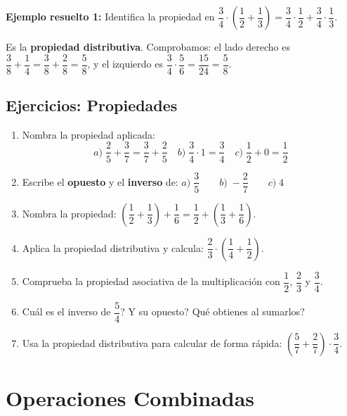 \documentclass[12pt, letterpaper]{article}
\begin{document}
\noindent\textbf{Ejemplo resuelto 1:} Identifica la propiedad en $\dfrac{3}{4} \cdot \left(\dfrac{1}{2} + \dfrac{1}{3}\right) = \dfrac{3}{4} \cdot \dfrac{1}{2} + \dfrac{3}{4} \cdot \dfrac{1}{3}$.

Es la \textbf{propiedad distributiva}. Comprobamos: el lado derecho es $\dfrac{3}{8} + \dfrac{1}{4} = \dfrac{3}{8} + \dfrac{2}{8} = \dfrac{5}{8}$, y el izquierdo es $\dfrac{3}{4} \cdot \dfrac{5}{6} = \dfrac{15}{24} = \dfrac{5}{8}$. \checkmark

\subsection{Ejercicios: Propiedades}

\begin{enumerate}[leftmargin=*]
  \item \facil{} Nombra la propiedad aplicada:
        \[ a)\; \frac{2}{5} + \frac{3}{7} = \frac{3}{7} + \frac{2}{5} \quad b)\; \frac{3}{4} \cdot 1 = \frac{3}{4} \quad c)\; \frac{1}{2} + 0 = \frac{1}{2} \]

  \item \facil{} Escribe el \textbf{opuesto} y el \textbf{inverso} de: $a)\; \dfrac{3}{5} \qquad b)\; -\dfrac{2}{7} \qquad c)\; 4$

  \item \facil{} Nombra la propiedad: $\left(\dfrac{1}{2} + \dfrac{1}{3}\right) + \dfrac{1}{6} = \dfrac{1}{2} + \left(\dfrac{1}{3} + \dfrac{1}{6}\right)$.

  \item \medio{} Aplica la propiedad distributiva y calcula: $\dfrac{2}{3} \cdot \left(\dfrac{1}{4} + \dfrac{1}{2}\right)$.

  \item \medio{} Comprueba la propiedad asociativa de la multiplicación con $\dfrac{1}{2}$, $\dfrac{2}{3}$ y $\dfrac{3}{4}$.

  \item \medio{} \textquestiondown Cuál es el inverso de $\dfrac{5}{4}$? \textquestiondown Y su opuesto? \textquestiondown Qué obtienes al sumarlos?

  \item \dificil{} Usa la propiedad distributiva para calcular de forma rápida: $\left(\dfrac{5}{7} + \dfrac{2}{7}\right) \cdot \dfrac{3}{4}$.
\end{enumerate}

\section{Operaciones Combinadas}
\end{document}
